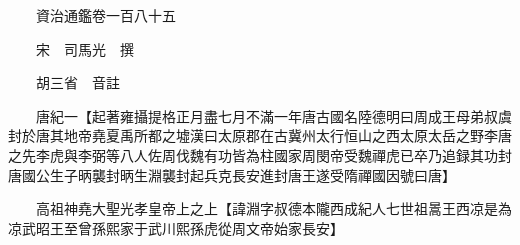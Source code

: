 










 


 
 


 

  
  
  
  
  





  
  
  
  
  
 
  

  

  
  
  



  

 
 

  
   




  

  
  


  　　資治通鑑卷一百八十五

　　宋　司馬光　撰

　　胡三省　音註

　　唐紀一【起著雍攝提格正月盡七月不滿一年唐古國名陸德明曰周成王母弟叔虞封於唐其地帝堯夏禹所都之墟漢曰太原郡在古冀州太行恒山之西太原太岳之野李唐之先李虎與李弼等八人佐周伐魏有功皆為柱國家周閔帝受魏禪虎已卒乃追録其功封唐國公生子昞襲封昞生淵襲封起兵克長安進封唐王遂受隋禪國因號曰唐】

　　高祖神堯大聖光孝皇帝上之上【諱淵字叔德本隴西成紀人七世祖暠王西凉是為凉武昭王至曾孫熙家于武川熙孫虎從周文帝始家長安】

